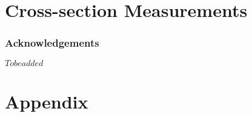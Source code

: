 \part{\HWW Cross-section Measurements}




\section*{Acknowledgements}
$To be added$

\clearpage
{}
\appendix
\part*{Appendix}




\printbibliography
% 
% 

% 

%

% 


